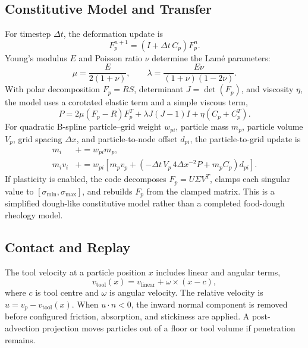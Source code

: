 \documentclass[conference]{IEEEtran}
\begin{document}
\subsection{Constitutive Model and Transfer}
For timestep $\Delta t$, the deformation update is
\begin{equation}
F_p^{n+1}=(I+\Delta t\,C_p)F_p^n.
\end{equation}
Young's modulus $E$ and Poisson ratio $\nu$ determine the Lam\'e parameters:
\begin{equation}
\mu=\frac{E}{2(1+\nu)},\qquad
\lambda=\frac{E\nu}{(1+\nu)(1-2\nu)}.
\end{equation}
With polar decomposition $F_p=RS$, determinant $J=\det(F_p)$, and viscosity $\eta$, the model uses a corotated elastic term and a simple viscous term,
\begin{equation}
P=2\mu(F_p-R)F_p^T+\lambda J(J-1)I+\eta(C_p+C_p^T).
\end{equation}
For quadratic B-spline particle--grid weight $w_{pi}$, particle mass $m_p$, particle volume $V_p$, grid spacing $\Delta x$, and particle-to-node offset $d_{pi}$, the particle-to-grid update is
\begin{align}
m_i &\mathrel{+}= w_{pi}m_p,\\
m_iv_i &\mathrel{+}=w_{pi}\left[m_pv_p+\left(-\Delta t\,V_p\,4\Delta x^{-2}P+m_pC_p\right)d_{pi}\right].
\end{align}
If plasticity is enabled, the code decomposes $F_p=U\Sigma V^T$, clamps each singular value to $[\sigma_{\min},\sigma_{\max}]$, and rebuilds $F_p$ from the clamped matrix. This is a simplified dough-like constitutive model rather than a completed food-dough rheology model.

\subsection{Contact and Replay}
The tool velocity at a particle position $x$ includes linear and angular terms,
\begin{equation}
v_{\mathrm{tool}}(x)=v_{\mathrm{linear}}+\omega\times(x-c),
\end{equation}
where $c$ is tool centre and $\omega$ is angular velocity. The relative velocity is $u=v_p-v_{\mathrm{tool}}(x)$. When $u\cdot n<0$, the inward normal component is removed before configured friction, absorption, and stickiness are applied. A post-advection projection moves particles out of a floor or tool volume if penetration remains.
\end{document}

